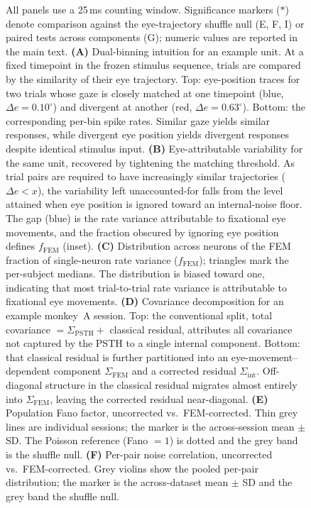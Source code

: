 \documentclass{lite}
\newcommand{\Cpsth}{\Sigma_{\text{PSTH}}}
\newcommand{\Cfem}{\Sigma_{\text{FEM}}}
\begin{document}
\begin{figure}[p]
  \ContinuedFloat
  \captionsetup{font=footnotesize,singlelinecheck=false}
  \caption{
  All panels use a 25\,ms counting window. Significance markers ($\ast$) denote comparison against the eye-trajectory shuffle null (E, F, I) or paired tests across components (G); numeric values are reported in the main text.
  \textbf{(A)} Dual-binning intuition for an example unit. At a fixed timepoint in the frozen stimulus sequence, trials are compared by the similarity of their eye trajectory. Top: eye-position traces for two trials whose gaze is closely matched at one timepoint (blue, $\Delta e = 0.10^\circ$) and divergent at another (red, $\Delta e = 0.63^\circ$). Bottom: the corresponding per-bin spike rates. Similar gaze yields similar responses, while divergent eye position yields divergent responses despite identical stimulus input.
  \textbf{(B)} Eye-attributable variability for the same unit, recovered by tightening the matching threshold. As trial pairs are required to have increasingly similar trajectories ($\Delta e < x$), the variability left unaccounted-for falls from the level attained when eye position is ignored toward an internal-noise floor. The gap (blue) is the rate variance attributable to fixational eye movements, and the fraction obscured by ignoring eye position defines $f_{\text{FEM}}$ (inset).
  \textbf{(C)} Distribution across neurons of the FEM fraction of single-neuron rate variance ($f_{\text{FEM}}$); triangles mark the per-subject medians. The distribution is biased toward one, indicating that most trial-to-trial rate variance is attributable to fixational eye movements.
  \textbf{(D)} Covariance decomposition for an example monkey~A session. Top: the conventional split, total covariance $= \Cpsth + $ classical residual, attributes all covariance not captured by the PSTH to a single internal component. Bottom: that classical residual is further partitioned into an eye-movement--dependent component $\Cfem$ and a corrected residual $\Sigma_{\text{int}}$. Off-diagonal structure in the classical residual migrates almost entirely into $\Cfem$, leaving the corrected residual near-diagonal.
  \textbf{(E)} Population Fano factor, uncorrected vs.\ FEM-corrected. Thin grey lines are individual sessions; the marker is the across-session mean $\pm$ SD. The Poisson reference (Fano $=1$) is dotted and the grey band is the shuffle null.
  \textbf{(F)} Per-pair noise correlation, uncorrected vs.\ FEM-corrected. Grey violins show the pooled per-pair distribution; the marker is the across-dataset mean $\pm$ SD and the grey band the shuffle null.
}
\end{figure}
\end{document}
